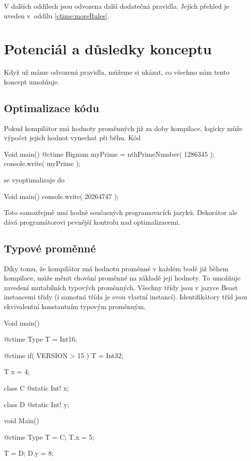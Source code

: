 V dalších oddílech jsou odvozena další dodatečná pravidla. Jejich přehled je uveden v~oddílu \ref{ctime:moreRules}.

\section{Potenciál a důsledky konceptu}
Když už máme odvozená pravidla, můžeme si ukázat, co všechno nám tento koncept umožňuje.

\subsection{Optimalizace kódu}
Pokud kompilátor zná hodnoty \ctime proměnných již za doby kompilace, logicky může výpočet jejich hodnot vynechat při běhu. Kód

\begin{code}
Void main() {
	@ctime Bignum myPrime = nthPrimeNumber( 1286345 );
	console.write( myPrime );
}
\end{code}

se vyoptimalizuje do

\begin{code}
Void main() {
	console.write( 20264747 );
}
\end{code}

Toto samozřejmě umí hodně současných programovacích jazyků. Dekorátor  ale dává programátorovi pevnější kontrolu nad optimalizacemi.

\subsection{Typové proměnné} \label{ctime:typeVars}
Díky tomu, že kompilátor zná hodnotu \ctime proměnné v každém bodě již během kompilace, může měnit chování \ctime proměnné na základě její hodnoty. To umožňuje zavedení mutabilních typových proměnných. Všechny třídy jsou v jazyce Beast instancemi třidy  (i samotná třída  je svou vlastní instancí). Identifikátory tříd jsou ekvivalentní konstantním typovým proměnným.

\begin{code}
Void main() {
	@ctime Type T = Int16;
	
	@ctime if( VERSION > 15 )
		T = Int32;
		
	T x = 4;
}
\end{code}

\begin{code}
class C {
	@static Int! x;
}

class D {
	@static Int! y;
}

void Main() {
	@ctime Type T = C;
	T.x = 5;
	
	T = D;
	D.y = 8;
}
\end{code}

